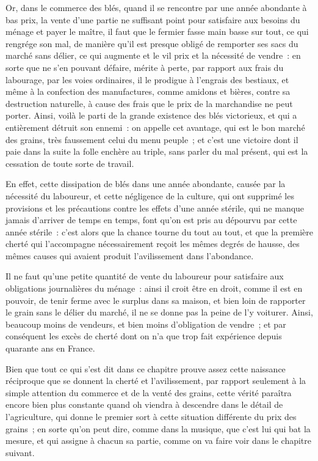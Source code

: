 \documentclass[french,twoside]{book} %
\begin{document}
Or, dans le commerce des blés, quand il se rencontre par une année abondante à bas prix, la vente d’une partie ne suffisant point pour satisfaire aux besoins du ménage et payer le maître, il faut que le fermier fasse main basse sur tout, ce qui rengrége son mal, de manière qu’il est presque obligé de remporter ses sacs du marché sans délier, ce qui augmente et le vil prix et la nécessité de vendre : en sorte que ne s’en pouvant défaire, mérite à perte, par rapport aux frais du labourage, par les voies ordinaires, il le prodigue à l’engrais des bestiaux, et même à la confection des manufactures, comme amidons et bières, contre sa destruction naturelle, à cause des frais que le prix de la marchandise ne peut porter. Ainsi, voilà le parti de la grande existence des blés victorieux, et qui a entièrement détruit son ennemi : on appelle cet avantage, qui est le bon marché des grains, très faussement celui du menu peuple ; et c’est une victoire dont il paie dans la suite la folle enchère au triple, sans parler du mal présent, qui est la cessation de toute sorte de travail.\par
En effet, cette dissipation de blés dans une année abondante, causée par la nécessité du laboureur, et cette négligence de la culture, qui ont supprimé les provisions et les précautions contre les effets d’une année stérile, qui ne manque jamais d’arriver de temps en temps, font qu’on est pris au dépourvu par cette année stérile : c’est alors que la chance tourne du tout au tout, et que la première cherté qui l’accompagne nécessairement reçoit les mêmes degrés de hausse, des mêmes causes qui avaient produit l’avilissement dans l’abondance.\par
Il ne faut qu’une petite quantité de vente du laboureur pour satisfaire aux obligations journalières du ménage : ainsi il croit être en droit, comme il est en pouvoir, de tenir ferme avec le surplus dans sa maison, et bien loin de rapporter le grain sans le délier du marché, il ne se donne pas la peine de l’y voiturer. Ainsi, beaucoup moins de vendeurs, et bien moins d’obligation de vendre ; et par conséquent les excès de cherté dont on n’a que trop fait expérience depuis quarante ans en France.\par
Bien que tout ce qui s’est dit dans ce chapitre prouve assez cette naissance réciproque que se donnent la cherté et l’avilissement, par rapport seulement à la simple attention du commerce et de la venté des grains, cette vérité paraîtra encore bien plus constante quand oh viendra à descendre dans le détail de l’agriculture, qui donne le premier sort à cette situation différente du prix des grains ; en sorte qu’on peut dire, comme dans la musique, que c’est lui qui bat la mesure, et qui assigne à chacun sa partie, comme on va faire voir dans le chapitre suivant.
\end{document}
